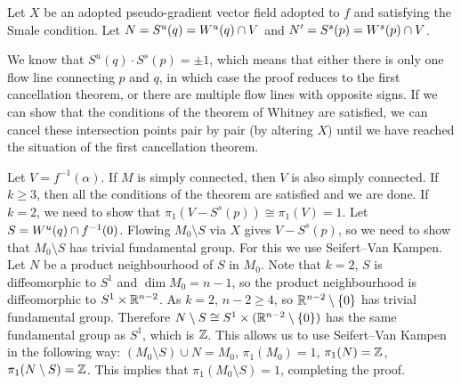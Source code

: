 \begin{myproof}
    Let $X$ be an adopted pseudo-gradient vector field adopted to  $f$ and satisfying the Smale condition.
    Let $N = S^{u}(q) = W^u(q) \cap V$ and $N' = S^{s}(p) = W^s(p) \cap  V$.

    We know that $S^{u}(q) \cdot S^{s}(p) = \pm 1$, which means that either there is only one flow line connecting $p$ and  $q$, in which case the proof reduces to the first cancellation theorem, or there are multiple flow lines with opposite signs.
    If we can show that the conditions of the theorem of Whitney are satisfied, we can cancel these intersection points pair by pair (by altering $X$) until we have reached the situation of the first cancellation theorem.

    Let $V = f^{-1}(\alpha)$.  If $M$ is simply connected, then $V$ is also simply connected.
    If $k \ge 3$, then all the conditions of the theorem are satisfied and we are done.
    If $k = 2$, we need to show that  $\pi_1(V - S^{s}(p)) \cong \pi_1(V) = 1$.
    Let $S = W^u(q) \cap f^{-1}(0)$.
    Flowing $M_0 \setminus S$ via $X$ gives  $V - S^{s}(p)$, so we need to show that $M_0 \setminus S$ has trivial fundamental group.
    For this we use Seifert--Van Kampen. Let $N$ be a product neighbourhood of $S$ in $M_0$.
    Note that $k=2$, $S$ is diffeomorphic to $S^{1}$ and $\dim M_0 = n-1$, so the product neighbourhood is diffeomorphic to $ S^1 \times \mathbb{R}^{n-2}$.
    As $k=2$, $n - 2 \ge 4$, so $\mathbb{R}^{n-2} \setminus \{ 0 \} $ has trivial fundamental group. Therefore $N \setminus S \cong S^{1} \times (\mathbb{R}^{n-2}\setminus \{0\})$ has the same fundamental group as $S^{1}$, which is $\mathbb{Z}$.
    This allows us to use Seifert--Van Kampen in the following way:
    $(M_0 \setminus S) \cup N = M_0$, $\pi_1(M_0) = 1$,  $\pi_1(N) = \mathbb{Z}$,  $\pi_1(N \setminus S) = \mathbb{Z}$. This implies that $\pi_1(M_0 \setminus S) = 1$, completing the proof.
\end{myproof}


